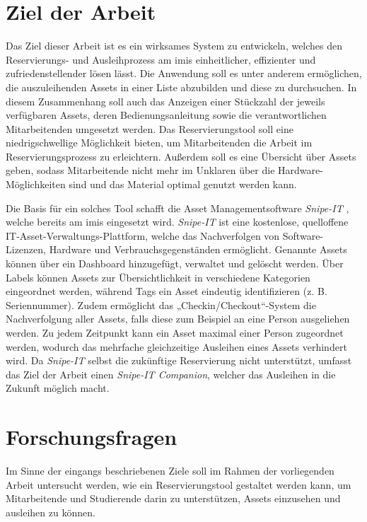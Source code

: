 \section{Ziel der Arbeit}
Das Ziel dieser Arbeit ist es ein wirksames System zu entwickeln, welches den Reservierungs- und
Ausleihprozess am \ac{imis} einheitlicher, effizienter und zufriedenstellender lösen lässt. Die
Anwendung soll es unter anderem ermöglichen, die auszuleihenden Assets in einer Liste abzubilden und
diese zu durchsuchen. In diesem Zusammenhang soll auch das Anzeigen einer Stückzahl der jeweils
verfügbaren Assets, deren Bedienungsanleitung sowie die verantwortlichen Mitarbeitenden umgesetzt
werden. Das Reservierungstool soll eine niedrigschwellige Möglichkeit bieten, um Mitarbeitenden die
Arbeit im Reservierungsprozess zu erleichtern. Außerdem soll es eine Übersicht über Assets
geben, sodass Mitarbeitende nicht mehr im Unklaren über die Hardware-Möglichkeiten sind und das
Material optimal genutzt werden kann.

Die Basis für ein solches Tool schafft die Asset Managementsoftware \textit{Snipe-IT}
\cite{noauthor_home_nodate}, welche bereits am \ac{imis} eingesetzt wird. \textit{Snipe-IT} ist eine
kostenlose, quelloffene IT-Asset-Verwaltungs-Plattform, welche das Nachverfolgen von
Software-Lizenzen, Hardware und Verbrauchsgegenständen ermöglicht. Genannte Assets können über ein
Dashboard hinzugefügt, verwaltet und gelöscht werden. Über Labels können Assets zur
Übersichtlichkeit in verschiedene Kategorien eingeordnet werden, während Tags ein Asset eindeutig
identifizieren (z. B. Seriennummer). Zudem ermöglicht das „Checkin/Checkout“-System die
Nachverfolgung aller Assets, falls diese zum Beispiel an eine Person ausgeliehen werden. Zu jedem
Zeitpunkt kann ein Asset maximal einer Person zugeordnet werden, wodurch das mehrfache gleichzeitige
Ausleihen eines Assets verhindert wird. Da \textit{Snipe-IT} selbst die zukünftige Reservierung
nicht unterstützt, umfasst das Ziel der Arbeit einen \textit{Snipe-IT Companion}, welcher das
Ausleihen in die Zukunft möglich macht.


\section{Forschungsfragen}
Im Sinne der eingangs beschriebenen Ziele soll im Rahmen der vorliegenden Arbeit untersucht werden,
wie ein Reservierungstool gestaltet werden kann, um Mitarbeitende und Studierende darin zu
unterstützen, Assets einzusehen und ausleihen zu können.

